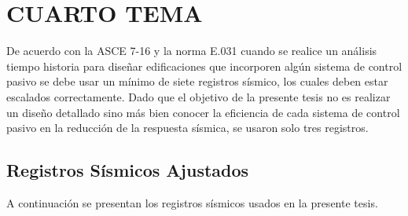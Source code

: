 \section{CUARTO TEMA}

De acuerdo con la ASCE 7-16 y la norma E.031 cuando se realice un análisis tiempo historia para diseñar edificaciones que incorporen algún sistema de control pasivo se debe usar un mínimo de siete registros sísmico, los cuales deben estar escalados correctamente. Dado que el objetivo de la presente tesis no es realizar un diseño detallado sino más bien conocer la eficiencia de cada sistema de control pasivo en la reducción de la respuesta sísmica, se usaron solo tres registros.

	\subsection{Registros Sísmicos Ajustados}
	
A continuación se presentan los registros sísmicos usados en la presente tesis.
			

